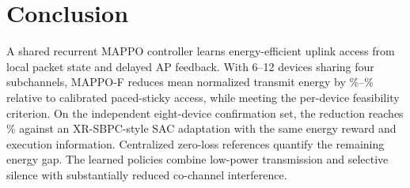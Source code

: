 \section{Conclusion}
A shared recurrent MAPPO controller learns energy-efficient uplink access
from local packet state and delayed AP feedback. With 6--12 devices sharing
four subchannels, MAPPO-F reduces mean normalized transmit energy by
\SavingSix\%--\SavingTwelve\% relative to calibrated paced-sticky access,
while meeting the per-device feasibility criterion. On the independent
eight-device confirmation set, the reduction reaches \ConfirmSavingSac\%
against an XR-SBPC-style SAC adaptation with the same energy reward and
execution information. Centralized zero-loss references quantify the
remaining energy gap. The learned policies combine low-power transmission
and selective silence with substantially reduced co-channel interference.
